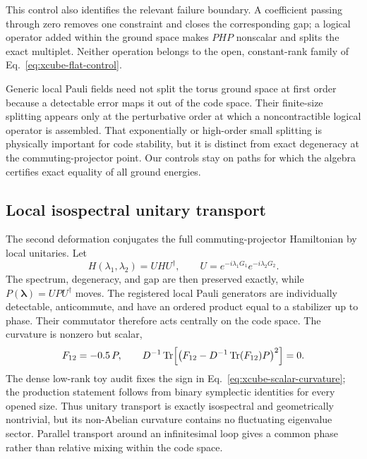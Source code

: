 This control also identifies the relevant failure boundary.  A coefficient
passing through zero removes one constraint and closes the corresponding
gap; a logical operator added within the ground space makes $PHP$ nonscalar
and splits the exact multiplet.  Neither operation belongs to the open,
constant-rank family of Eq.~\eqref{eq:xcube-flat-control}.

Generic local Pauli fields need not split the torus ground space at first
order because a detectable error maps it out of the code space.  Their
finite-size splitting appears only at the perturbative order at which a
noncontractible logical operator is assembled.  That exponentially or
high-order small splitting is physically important for code stability, but
it is distinct from exact degeneracy at the commuting-projector point.  Our
controls stay on paths for which the algebra certifies exact equality of all
ground energies.

\subsection{Local isospectral unitary transport}

The second deformation conjugates the full commuting-projector Hamiltonian
by local unitaries.  Let
\begin{equation}
 H(\lambda_1,\lambda_2)=UHU^\dagger,
 \qquad
 U=e^{-i\lambda_1G_1}e^{-i\lambda_2G_2}.
 \label{eq:xcube-unitary-transport}
\end{equation}
The spectrum, degeneracy, and gap are then preserved exactly, while
$P(\boldsymbol\lambda)=UPU^\dagger$ moves.  The registered local Pauli
generators are individually detectable, anticommute, and have an ordered
product equal to a stabilizer up to phase.  Their commutator therefore acts
centrally on the code space.  The curvature is nonzero but scalar,
\begin{equation}
 F_{12}=-0.5\,P,
 \qquad
 D^{-1}\operatorname{Tr}\!\left[
   \bigl(F_{12}-D^{-1}\operatorname{Tr}(F_{12})P\bigr)^2
 \right]=0.
 \label{eq:xcube-scalar-curvature}
\end{equation}
The dense low-rank toy audit fixes the sign in
Eq.~\eqref{eq:xcube-scalar-curvature}; the production statement follows from
binary symplectic identities for every opened size.  Thus unitary transport
is exactly isospectral and geometrically nontrivial, but its non-Abelian
curvature contains no fluctuating eigenvalue sector.  Parallel transport
around an infinitesimal loop gives a common phase rather than relative
mixing within the code space.

